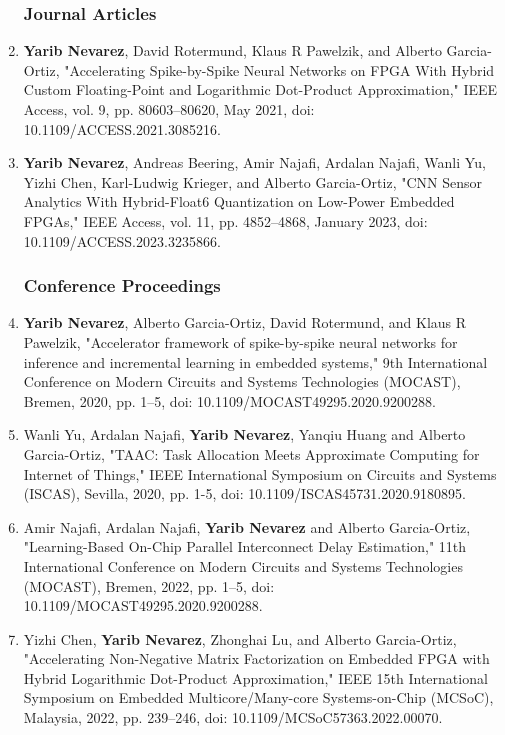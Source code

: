 \begin{enumerate}
	
	\subsubsection*{Journal Articles}
	
	\item \textbf{Yarib Nevarez}, David Rotermund, Klaus R Pawelzik, and Alberto Garcia-Ortiz, "Accelerating Spike-by-Spike Neural Networks on FPGA With Hybrid Custom Floating-Point and Logarithmic Dot-Product Approximation," 
	\newblock IEEE Access, vol. 9, pp. 80603--80620, May 2021, doi: 10.1109/ACCESS.2021.3085216.  
	
	\item \textbf{Yarib Nevarez}, Andreas Beering, Amir Najafi, Ardalan Najafi, Wanli Yu, Yizhi Chen, Karl-Ludwig Krieger, and Alberto Garcia-Ortiz, "CNN Sensor Analytics With Hybrid-Float6 Quantization on Low-Power Embedded FPGAs," 
	\newblock IEEE Access, vol. 11, pp. 4852--4868, January 2023, doi: 10.1109/ACCESS.2023.3235866.

	
	\subsubsection*{Conference Proceedings}
	
	\item \textbf{Yarib Nevarez}, Alberto Garcia-Ortiz, David Rotermund, and Klaus R Pawelzik, "Accelerator framework of spike-by-spike neural networks for inference and incremental learning in embedded systems,"
	 9th International Conference on Modern Circuits and Systems Technologies (MOCAST), Bremen, 2020, pp. 1--5, doi: 10.1109/MOCAST49295.2020.9200288.
	
	\item Wanli Yu, Ardalan Najafi, \textbf{Yarib Nevarez}, Yanqiu Huang and Alberto Garcia-Ortiz, "TAAC: Task Allocation Meets Approximate Computing for Internet of Things," 
	 IEEE International Symposium on Circuits and Systems (ISCAS), Sevilla, 2020, pp. 1-5, doi: 10.1109/ISCAS45731.2020.9180895.
	
	\item Amir Najafi, Ardalan Najafi, \textbf{Yarib Nevarez} and Alberto Garcia-Ortiz, "Learning-Based On-Chip Parallel Interconnect Delay Estimation," 
	 11th International Conference on Modern Circuits and Systems Technologies (MOCAST), Bremen, 2022, pp. 1--5, doi: 10.1109/MOCAST49295.2020.9200288.
	
	\item Yizhi Chen, \textbf{Yarib Nevarez}, Zhonghai Lu, and Alberto Garcia-Ortiz, "Accelerating Non-Negative Matrix Factorization on Embedded FPGA with Hybrid Logarithmic Dot-Product Approximation," 
	 IEEE 15th International Symposium on Embedded Multicore/Many-core Systems-on-Chip (MCSoC), Malaysia, 2022, pp. 239--246, doi: 10.1109/MCSoC57363.2022.00070.
	
\end{enumerate}

